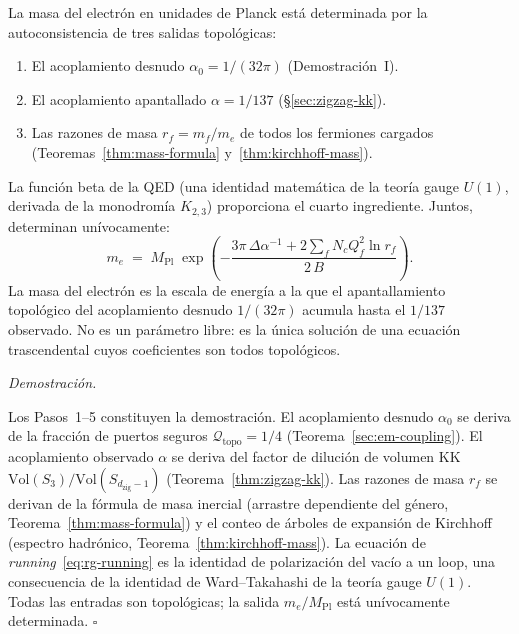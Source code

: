 \documentclass[11pt, a4paper, openany]{book}
\renewenvironment{proof}[1][Demostraci\'on]{%
  \par\noindent\textit{#1.}\quad
}{\hfill$\square$\par\medskip}
\begin{document}
\begin{theorem}
\label{thm:electron-mass}
La masa del electr\'on en unidades de Planck est\'a determinada por la
autoconsistencia de tres salidas topol\'ogicas:
\begin{enumerate}
  \item El acoplamiento desnudo $\alpha_0 = 1/(32\pi)$
    (Demostraci\'on~I).
  \item El acoplamiento apantallado $\alpha = 1/137$
    (\S\ref{sec:zigzag-kk}).
  \item Las razones de masa $r_f = m_f/m_e$ de todos los fermiones
    cargados (Teoremas~\ref{thm:mass-formula}
    y~\ref{thm:kirchhoff-mass}).
\end{enumerate}
La funci\'on beta de la QED (una identidad matem\'atica de la teor\'ia
gauge $U(1)$, derivada de la monodrom\'ia $K_{2,3}$) proporciona el
cuarto ingrediente. Juntos, determinan un\'ivocamente:
\begin{equation}
  m_e \;=\; M_{\mathrm{Pl}} \;\exp\!\left(
  -\frac{3\pi\,\Delta\alpha^{-1}
    + 2\!\sum_f N_c Q_f^2 \ln r_f}{2\,B}
  \right).
  \label{eq:me-absolute}
\end{equation}
La masa del electr\'on es la escala de energ\'ia a la que el
apantallamiento topol\'ogico del acoplamiento desnudo $1/(32\pi)$
acumula hasta el $1/137$ observado. No es un par\'ametro libre: es la
\'unica soluci\'on de una ecuaci\'on trascendental cuyos coeficientes
son todos topol\'ogicos.
\end{theorem}

\begin{proof}
Los Pasos~1--5 constituyen la demostraci\'on. El acoplamiento desnudo
$\alpha_0$ se deriva de la fracci\'on de puertos seguros
$\mathcal{Q}_{\mathrm{topo}} = 1/4$
(Teorema~\ref{sec:em-coupling}). El acoplamiento observado $\alpha$ se
deriva del factor de diluci\'on de volumen KK
$\mathrm{Vol}(S_3)/\mathrm{Vol}(S_{d_{\mathrm{zig}}-1})$
(Teorema~\ref{thm:zigzag-kk}). Las razones de masa $r_f$ se derivan de
la f\'ormula de masa inercial (arrastre dependiente del g\'enero,
Teorema~\ref{thm:mass-formula}) y el conteo de \'arboles de expansi\'on
de Kirchhoff (espectro hadr\'onico, Teorema~\ref{thm:kirchhoff-mass}).
La ecuaci\'on de \emph{running}~\eqref{eq:rg-running} es la identidad
de polarizaci\'on del vac\'io a un loop, una consecuencia de la
identidad de Ward--Takahashi de la teor\'ia gauge $U(1)$. Todas las
entradas son topol\'ogicas; la salida $m_e/M_{\mathrm{Pl}}$ est\'a
un\'ivocamente determinada.
\end{proof}
\end{document}
